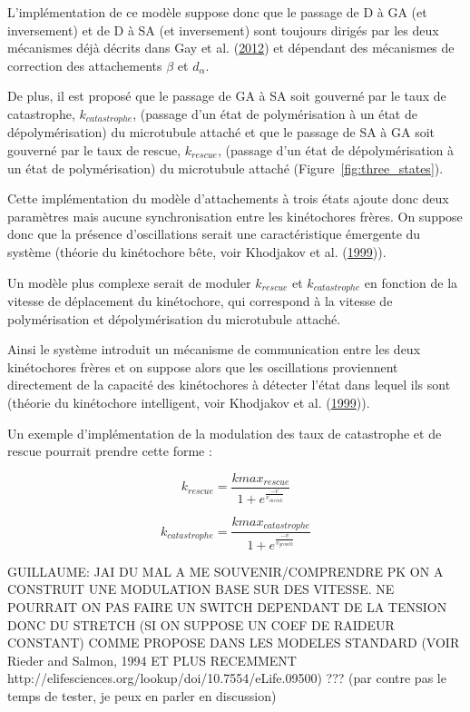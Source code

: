 \documentclass[12pt,a4paper,twoside,openright]{book}
\begin{document}
L'implémentation de ce modèle suppose donc que le passage de D à GA (et
inversement) et de D à SA (et inversement) sont toujours dirigés par les
deux mécanismes déjà décrits dans Gay et al.
(\hyperref[ref-Gay2012a]{2012}) et dépendant des mécanismes de
correction des attachements \(\beta\) et \(d_{\alpha}\).

De plus, il est proposé que le passage de GA à SA soit gouverné par le
taux de catastrophe, \(k_{catastrophe}\), (passage d'un état de
polymérisation à un état de dépolymérisation) du microtubule attaché et
que le passage de SA à GA soit gouverné par le taux de rescue,
\(k_{rescue}\), (passage d'un état de dépolymérisation à un état de
polymérisation) du microtubule attaché (Figure~\ref{fig:three_states}).

Cette implémentation du modèle d'attachements à trois états ajoute donc
deux paramètres mais aucune synchronisation entre les kinétochores
frères. On suppose donc que la présence d'oscillations serait une
caractéristique émergente du système (théorie du kinétochore bête, voir
Khodjakov et al. (\hyperref[ref-Khodjakov1999]{1999})).

Un modèle plus complexe serait de moduler \(k_{rescue}\) et
\(k_{catastrophe}\) en fonction de la vitesse de déplacement du
kinétochore, qui correspond à la vitesse de polymérisation et
dépolymérisation du microtubule attaché.

Ainsi le système introduit un mécanisme de communication entre les deux
kinétochores frères et on suppose alors que les oscillations proviennent
directement de la capacité des kinétochores à détecter l'état dans
lequel ils sont (théorie du kinétochore intelligent, voir Khodjakov et
al. (\hyperref[ref-Khodjakov1999]{1999})).

Un exemple d'implémentation de la modulation des taux de catastrophe et
de rescue pourrait prendre cette forme :

\[
k_{rescue} = \frac{kmax_{rescue}}{1 + e^{\frac{-v}{v_{shrink}}}}
\]

\[
k_{catastrophe} = \frac{kmax_{catastrophe}}{1 + e^{\frac{-v}{v_{growth}}}}
\]

GUILLAUME: JAI DU MAL A ME SOUVENIR/COMPRENDRE PK ON A CONSTRUIT UNE
MODULATION BASE SUR DES VITESSE. NE POURRAIT ON PAS FAIRE UN SWITCH
DEPENDANT DE LA TENSION DONC DU STRETCH (SI ON SUPPOSE UN COEF DE
RAIDEUR CONSTANT) COMME PROPOSE DANS LES MODELES STANDARD (VOIR Rieder
and Salmon, 1994 ET PLUS RECEMMENT
http://elifesciences.org/lookup/doi/10.7554/eLife.09500) ??? (par contre
pas le temps de tester, je peux en parler en discussion)
\end{document}
